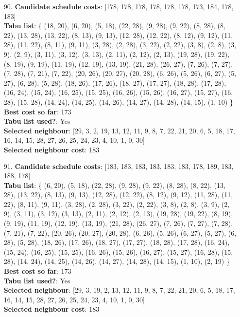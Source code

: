 \documentclass[fleqn]{article}
\begin{document}
\begin{itemize}
    \item[90.] \textbf{Candidate schedule costs}: [178, 178, 178, 178, 178, 178, 173, 184, 178, 183] \\
    \textbf{Tabu list}: \{ (18, 20), (6, 20), (5, 18), (22, 28), (9, 28), (9, 22), (8, 28), (8, 22), (13, 28), (13, 22), (8, 13), (9, 13), (12, 28), (12, 22), (8, 12), (9, 12), (11, 28), (11, 22), (8, 11), (9, 11), (3, 28), (2, 28), (3, 22), (2, 22), (3, 8), (2, 8), (3, 9), (2, 9), (3, 11), (3, 12), (3, 13), (2, 11), (2, 12), (2, 13), (19, 28), (19, 22), (8, 19), (9, 19), (11, 19), (12, 19), (13, 19), (21, 28), (26, 27), (7, 26), (7, 27), (7, 28), (7, 21), (7, 22), (20, 26), (20, 27), (20, 28), (6, 26), (5, 26), (6, 27), (5, 27), (6, 28), (5, 28), (18, 26), (17, 26), (18, 27), (17, 27), (18, 28), (17, 28), (16, 24), (15, 24), (16, 25), (15, 25), (16, 26), (15, 26), (16, 27), (15, 27), (16, 28), (15, 28), (14, 24), (14, 25), (14, 26), (14, 27), (14, 28), (14, 15), (1, 10) \} \\
    \textbf{Best cost so far}: 173 \\
    \textbf{Tabu list used?}: Yes \\
    \textbf{Selected neighbour}: [29, 3, 2, 19, 13, 12, 11, 9, 8, 7, 22, 21, 20, 6, 5, 18, 17, 16, 14, 15, 28, 27, 26, 25, 24, 23, 4, 10, 1, 0, 30] \\
    \textbf{Selected neighbour cost}: 183
      

    \item[91.] \textbf{Candidate schedule costs}: [183, 183, 183, 183, 183, 183, 178, 189, 183, 188, 178] \\
    \textbf{Tabu list}: \{ (6, 20), (5, 18), (22, 28), (9, 28), (9, 22), (8, 28), (8, 22), (13, 28), (13, 22), (8, 13), (9, 13), (12, 28), (12, 22), (8, 12), (9, 12), (11, 28), (11, 22), (8, 11), (9, 11), (3, 28), (2, 28), (3, 22), (2, 22), (3, 8), (2, 8), (3, 9), (2, 9), (3, 11), (3, 12), (3, 13), (2, 11), (2, 12), (2, 13), (19, 28), (19, 22), (8, 19), (9, 19), (11, 19), (12, 19), (13, 19), (21, 28), (26, 27), (7, 26), (7, 27), (7, 28), (7, 21), (7, 22), (20, 26), (20, 27), (20, 28), (6, 26), (5, 26), (6, 27), (5, 27), (6, 28), (5, 28), (18, 26), (17, 26), (18, 27), (17, 27), (18, 28), (17, 28), (16, 24), (15, 24), (16, 25), (15, 25), (16, 26), (15, 26), (16, 27), (15, 27), (16, 28), (15, 28), (14, 24), (14, 25), (14, 26), (14, 27), (14, 28), (14, 15), (1, 10), (2, 19) \} \\
    \textbf{Best cost so far}: 173 \\
    \textbf{Tabu list used?}: Yes \\
    \textbf{Selected neighbour}: [29, 3, 19, 2, 13, 12, 11, 9, 8, 7, 22, 21, 20, 6, 5, 18, 17, 16, 14, 15, 28, 27, 26, 25, 24, 23, 4, 10, 1, 0, 30] \\
    \textbf{Selected neighbour cost}: 183
      


\end{itemize}
\end{document}
